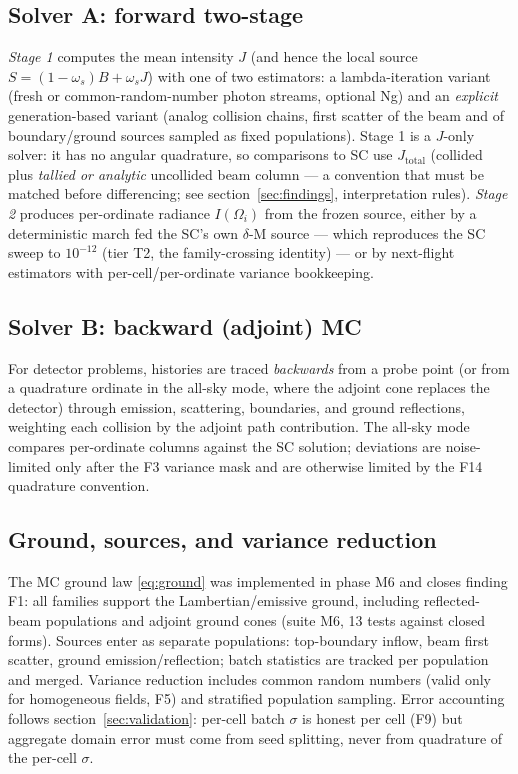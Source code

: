 \documentclass[11pt,a4paper]{article}
\newcommand{\Om}{\Omega}
\begin{document}
\subsection{Solver A: forward two-stage}

\emph{Stage 1} computes the mean intensity $J$ (and hence the local source
$S=(1-\omega_s)B+\omega_s J$) with one of two estimators:
a lambda-iteration variant (fresh or common-random-number photon streams,
optional Ng) and an \emph{explicit} generation-based variant (analog
collision chains, first scatter of the beam and of boundary/ground
sources sampled as fixed populations). Stage 1 is a $J$-only solver: it
has no angular quadrature, so comparisons to SC use $J_{\mathrm{total}}$
(collided plus \emph{tallied or analytic} uncollided beam column --- a
convention that must be matched before differencing; see
section~\ref{sec:findings}, interpretation rules).
\emph{Stage 2} produces per-ordinate radiance $I(\Om_i)$ from the frozen
source, either by a deterministic march fed the SC's own $\delta$-M
source --- which reproduces the SC sweep to $10^{-12}$ (tier T2, the
family-crossing identity) --- or by next-flight estimators with
per-cell/per-ordinate variance bookkeeping.

\subsection{Solver B: backward (adjoint) MC}

For detector problems, histories are traced \emph{backwards} from a probe
point (or from a quadrature ordinate in the all-sky mode, where the adjoint
cone replaces the detector) through emission, scattering, boundaries, and
ground reflections, weighting each collision by the adjoint path
contribution. The all-sky mode compares per-ordinate columns against the
SC solution; deviations are noise-limited only after the F3 variance mask
and are otherwise limited by the F14 quadrature convention.

\subsection{Ground, sources, and variance reduction}

The MC ground law \eqref{eq:ground} was implemented in phase M6 and closes
finding F1: all families support the Lambertian/emissive ground, including
reflected-beam populations and adjoint ground cones (suite M6, 13 tests
against closed forms). Sources enter as separate populations: top-boundary
inflow, beam first scatter, ground emission/reflection; batch statistics
are tracked per population and merged. Variance reduction includes
common random numbers (valid only for homogeneous fields, F5) and
stratified population sampling. Error accounting follows
section~\ref{sec:validation}: per-cell batch $\sigma$ is honest per cell
(F9) but aggregate domain error must come from seed splitting, never from
quadrature of the per-cell $\sigma$.
\end{document}
